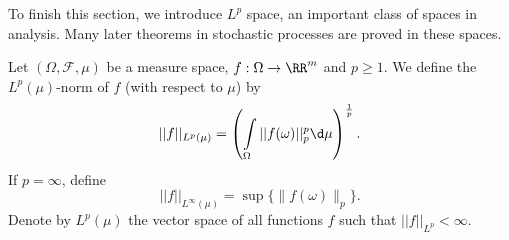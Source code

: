 To finish this section, we introduce $L^p$ space, an important class of spaces in analysis. Many later theorems in stochastic processes are proved in these spaces.

\begin{definition}
    Let $(\Omega,\mathcal{F},\mu)$ be a measure space, $f:\Omega\to\RR^m$ and $p\ge 1$. We define the $L^p(\mu)$-norm of $f$ (with respect to $\mu$) by
    $$||f||_{L^p(\mu)}=\left(\int\limits_\Omega ||f(\omega)||^p_p\d \mu\right)^\frac{1}{p}.$$
    If $p=\infty$, define
    $$||f||_{L^\infty(\mu)}=\sup\{\|f(\omega)\|_p\}.$$
    Denote by $L^p(\mu)$ the vector space of all functions $f$ such that $||f||_{L^p}<\infty$.
\end{definition}